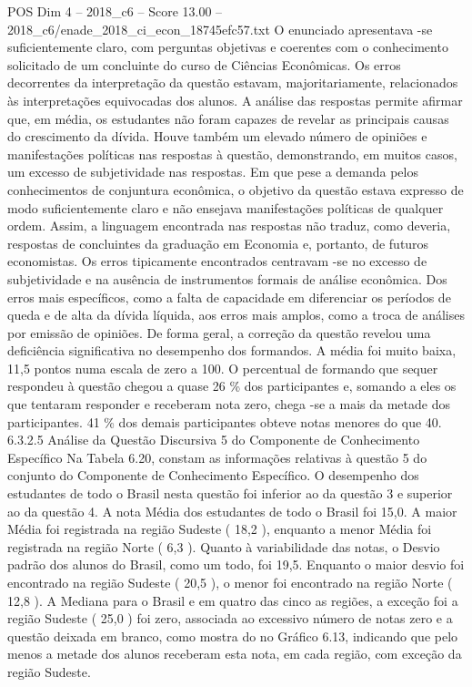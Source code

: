 \begin{textsample}{POS Dim 4 – 2018\_c6 – Score 13.00 – 2018\_c6/enade\_2018\_ci\_econ\_18745efc57.txt}
O enunciado apresentava -se suficientemente claro, com perguntas objetivas e coerentes com o conhecimento solicitado de um concluinte do curso de Ciências Econômicas.
Os erros decorrentes da interpretação da questão estavam, majoritariamente, relacionados às interpretações equivocadas dos alunos.
A análise das respostas permite afirmar que, em média, os estudantes não foram capazes de revelar as principais causas do crescimento da dívida.
Houve também um elevado número de opiniões e manifestações políticas nas respostas à questão, demonstrando, em muitos casos, um excesso de subjetividade nas respostas.
Em que pese a demanda pelos conhecimentos de conjuntura econômica, o objetivo da questão estava expresso de modo suficientemente claro e não ensejava manifestações políticas de qualquer ordem.
Assim, a linguagem encontrada nas respostas não traduz, como deveria, respostas de concluintes da graduação em Economia e, portanto, de futuros economistas.
Os erros tipicamente encontrados centravam -se no excesso de subjetividade e na ausência de instrumentos formais de análise econômica.
Dos erros mais específicos, como a falta de capacidade em diferenciar os períodos de queda e de alta da dívida líquida, aos erros mais amplos, como a troca de análises por emissão de opiniões.
De forma geral, a correção da questão revelou uma deficiência significativa no desempenho dos formandos.
A média foi muito baixa, 11,5 pontos numa escala de zero a 100.
O percentual de formando que sequer respondeu à questão chegou a quase 26 \% dos participantes e, somando a eles os que tentaram responder e receberam nota zero, chega -se a mais da metade dos participantes. 41 \% dos demais participantes obteve notas menores do que 40. 6.3.2.5 Análise da Questão Discursiva 5 do Componente de Conhecimento Específico Na Tabela 6.20, constam as informações relativas à questão 5 do conjunto do Componente de Conhecimento Específico.
O desempenho dos estudantes de todo o Brasil nesta questão foi inferior ao da questão 3 e superior ao da questão 4.
A nota Média dos estudantes de todo o Brasil foi 15,0.
A maior Média foi registrada na região Sudeste ( 18,2 ), enquanto a menor Média foi registrada na região Norte ( 6,3 ).
Quanto à variabilidade das notas, o Desvio padrão dos alunos do Brasil, como um todo, foi 19,5.
Enquanto o maior desvio foi encontrado na região Sudeste ( 20,5 ), o menor foi encontrado na região Norte ( 12,8 ).
A Mediana para o Brasil e em quatro das cinco as regiões, a exceção foi a região Sudeste ( 25,0 ) foi zero, associada ao excessivo número de notas zero e a questão deixada em branco, como mostra do no Gráfico 6.13, indicando que pelo menos a metade dos alunos receberam esta nota, em cada região, com exceção da região Sudeste.

\end{textsample}
